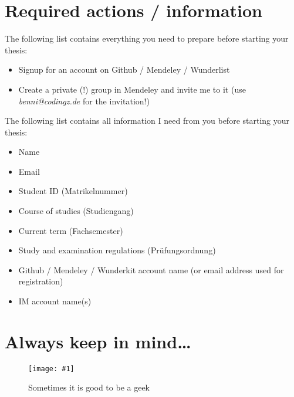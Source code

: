 \documentclass{article}
\newcommand{\img}[4]{
	\begin{figure}[!htb]
		\centering
		\texttt{[image: \#1]}
		\caption{#3}
		\label{#2}
	\end{figure}
}
\begin{document}
\section{Required actions / information}

The following list contains everything you need to prepare before starting your thesis:

\begin{itemize}
	\item Signup for an account on Github / Mendeley / Wunderlist
	\item Create a private (!) group in Mendeley and invite me to it (use \emph{benni@codingz.de} for the invitation!)
\end{itemize}

The following list contains all information I need from you before starting your thesis:

\begin{itemize}
	\item Name
	\item Email
	\item Student ID (Matrikelnummer)
	\item Course of studies (Studiengang)
	\item Current term (Fachsemester)
	\item Study and examination regulations (Pr\"{u}fungsordnung)
	\item Github / Mendeley / Wunderkit account name (or email address used for registration)
	\item IM account name(s)
\end{itemize}





\section{Always keep in mind\dots}

\img{repetetive-tasks.png}{fig:geeks}{Sometimes it is good to be a geek}{0.6}
\end{document}

